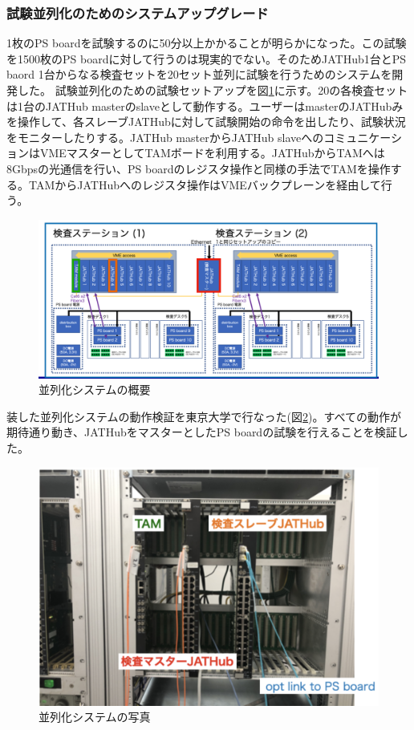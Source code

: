 \subsubsection{試験並列化のためのシステムアップグレード}
\label{subsubsec_parallel}
1枚のPS boardを試験するのに50分以上かかることが明らかになった。この試験を1500枚のPS boardに対して行うのは現実的でない。そのためJATHub1台とPS baord 1台からなる検査セットを20セット並列に試験を行うためのシステムを開発した。
試験並列化のための試験セットアップを図\ref{QAQCpararell}に示す。20の各検査セットは1台のJATHub masterのslaveとして動作する。ユーザーはmasterのJATHubみを操作して、各スレーブJATHubに対して試験開始の命令を出したり、試験状況をモニターしたりする。JATHub masterからJATHub slaveへのコミュニケーションはVMEマスターとしてTAMボードを利用する。JATHubからTAMへは8Gbpsの光通信を行い、PS boardのレジスタ操作と同様の手法でTAMを操作する。TAMからJATHubへのレジスタ操作はVMEバックプレーンを経由して行う。

\begin{figure} 
\centering
\includegraphics[width=16cm]{fig/QAQCpararell.png}
\caption[並列化システムの概要]{並列化システムの概要}
\label{QAQCpararell}
\end{figure}
装した並列化システムの動作検証を東京大学で行なった(図\ref{QAQCpararellpicture})。すべての動作が期待通り動き、JATHubをマスターとしたPS boardの試験を行えることを検証した。

\begin{figure} 
\centering
\includegraphics[width=16cm]{fig/QAQCpararellpicture.png}
\caption[並列化システムの写真]{並列化システムの写真}
\label{QAQCpararellpicture}
\end{figure}

